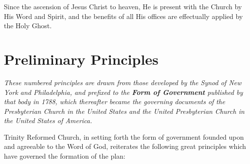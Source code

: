 \documentclass[
]{book}
\begin{document}
Since the ascension of Jesus Christ to heaven, He is present with the Church by His Word and Spirit, and the benefits of all His offices are effectually applied by the Holy Ghost.

\hypertarget{preliminary-principles}{%
\section*{Preliminary Principles}\label{preliminary-principles}}

\emph{These numbered principles are drawn from those developed by the Synod of New York and Philadelphia, and prefixed to the \textbf{Form of Government} published by that body in 1788, which thereafter became the governing documents of the Presbyterian Church in the United States and the United Presbyterian Church in the United States of America.}

Trinity Reformed Church, in setting forth the form of government founded upon and agreeable to the Word of God, reiterates the following great principles which have governed the formation of the plan:
\end{document}
